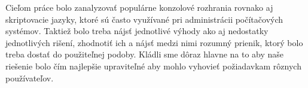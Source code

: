 Cieľom práce bolo zanalyzovať populárne konzolové rozhrania rovnako aj skriptovacie jazyky, ktoré sú často využívané pri administrácii počítačových systémov. Taktiež bolo treba nájsť jednotlivé výhody ako aj nedostatky jednotlivých rišení, zhodnotiť ich a nájsť medzi nimi rozumný prienik, ktorý bolo treba dostať do použiteľnej podoby.
Kládli sme dôraz hlavne na to aby naše riešenie bolo čím najlepšie upraviteľné aby mohlo vyhovieť požiadavkam rôznych používateľov.